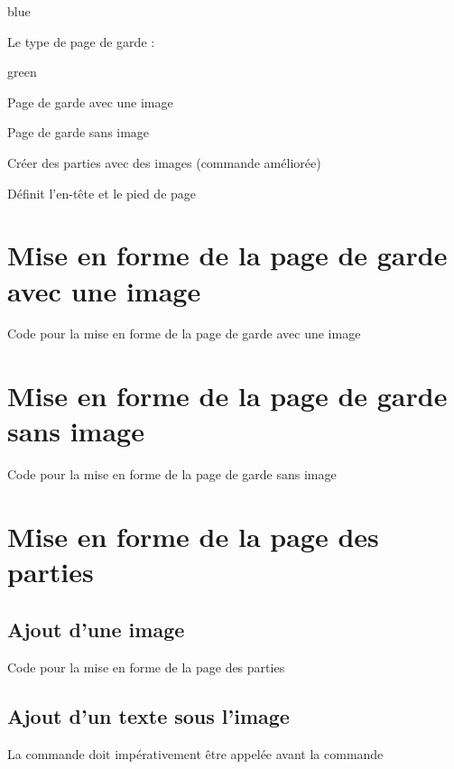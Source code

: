 {\begin{items}{blue}{\Triangle}
  \item Le type de page de garde : 
  \begin{items}{green}{\Triangle}
    \item Page de garde avec une image
    \item Page de garde sans image
  \end{items}
  \item Créer des parties avec des images (commande  améliorée)
  \item Définit l'en-tête et le pied de page
\end{items}
\section{Mise en forme de la page de garde avec une image}

\begin{Latex}{Code pour la mise en forme de la page de garde avec une image}
\end{Latex}


\section{Mise en forme de la page de garde sans image}

\begin{Latex}{Code pour la mise en forme de la page de garde sans image}
\end{Latex}

\section{Mise en forme de la page des parties}

\subsection{Ajout d'une image}
\begin{Latex}{Code pour la mise en forme de la page des parties}
\end{Latex}


\subsection{Ajout d'un texte sous l'image}
La commande  doit impérativement être appelée avant la commande 

}
